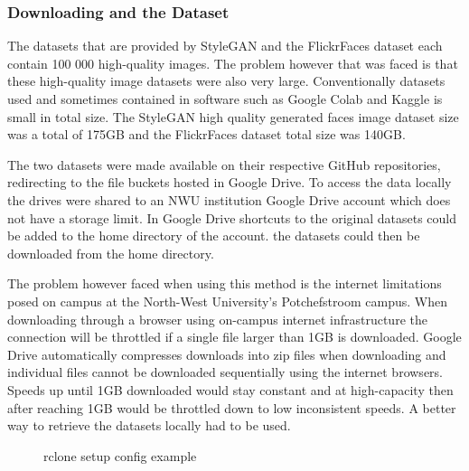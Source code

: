 \subsubsection{Downloading and the Dataset}

The datasets that are provided by StyleGAN and the FlickrFaces dataset each contain 100 000 high-quality images. The problem however that was faced is that these high-quality image datasets were also very large. Conventionally datasets used and sometimes contained in software such as Google Colab and Kaggle is small in total size. The StyleGAN high quality generated faces image dataset size was a total of 175GB and the FlickrFaces dataset total size was 140GB. 

The two datasets were made available on their respective GitHub repositories, redirecting to the file buckets hosted in Google Drive. To access the data locally the drives were shared to an NWU institution Google Drive account which does not have a storage limit. In Google Drive shortcuts to the original datasets could be added to the home directory of the account. the datasets could then be downloaded from the home directory.

The problem however faced when using this method is the internet limitations posed on campus at the North-West University's Potchefstroom campus. When downloading through a browser using on-campus internet infrastructure the connection will be throttled if a single file larger than 1GB is downloaded. Google Drive automatically compresses downloads into zip files when downloading and individual files cannot be downloaded sequentially using the internet browsers. Speeds up until 1GB downloaded would stay constant and at high-capacity then after reaching 1GB would be throttled down to low inconsistent speeds. A better way to retrieve the datasets locally had to be used.

\begin{figure}[H]%
\centering
{}%
\caption{rclone setup config example \citep{rclone2021}}%
\label{fig:10}%
\end{figure}

